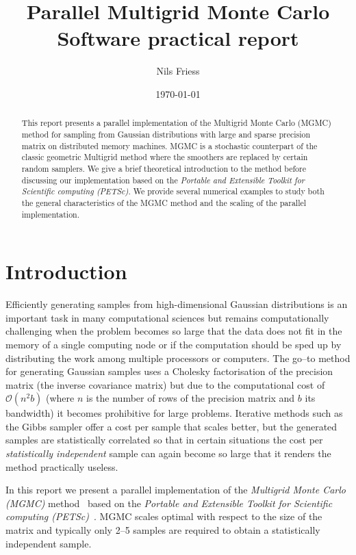\documentclass[
fontsize=11pt,
paper=a4,
numbers=noenddot
]{scrartcl}
\title{Parallel Multigrid Monte Carlo\\
{\normalsize Software practical report}}
\date{\today}
\author{Nils Friess}
\begin{document}
 
\maketitle

\begin{abstract}
    This report presents a parallel implementation of the Multigrid Monte Carlo (MGMC) method for sampling from Gaussian distributions with large and sparse precision matrix on distributed memory machines. MGMC is a stochastic counterpart of the classic geometric Multigrid method where the smoothers are replaced by certain random samplers. We give a brief theoretical introduction to the method before discussing our implementation based on the \emph{Portable and Extensible Toolkit for Scientific computing (PETSc)}. We provide several numerical examples to study both the general characteristics of the MGMC method and the scaling of the parallel implementation.
\end{abstract}

\section{Introduction}
Efficiently generating samples from high-dimensional Gaussian distributions is an important task in many computational sciences but remains computationally challenging when the problem becomes so large that the data does not fit in the memory of a single computing node or if the computation should be sped up by distributing the work among multiple processors or computers. The go--to method for generating Gaussian samples uses a Cholesky factorisation of the precision matrix (the inverse covariance matrix) but due to the computational cost of $\mathcal{O}(n^2 b)$ (where $n$ is the number of rows of the precision matrix and $b$ its bandwidth) it becomes prohibitive for large problems. Iterative methods such as the Gibbs sampler offer a cost per sample that scales better, but the generated samples are statistically correlated so that in certain situations the cost per \emph{statistically independent} sample can again become so large that it renders the method practically useless.

In this report we present a parallel implementation of the \emph{Multigrid Monte Carlo (MGMC)} method~\cite{goodmansokal} based on the \emph{Portable and Extensible  Toolkit for Scientific computing (PETSc)}~\cite{petsc-web-page,petsc-user-ref}. MGMC scales optimal with respect to the size of the matrix and typically only 2--5 samples are required to obtain a statistically independent sample. 
\end{document}
